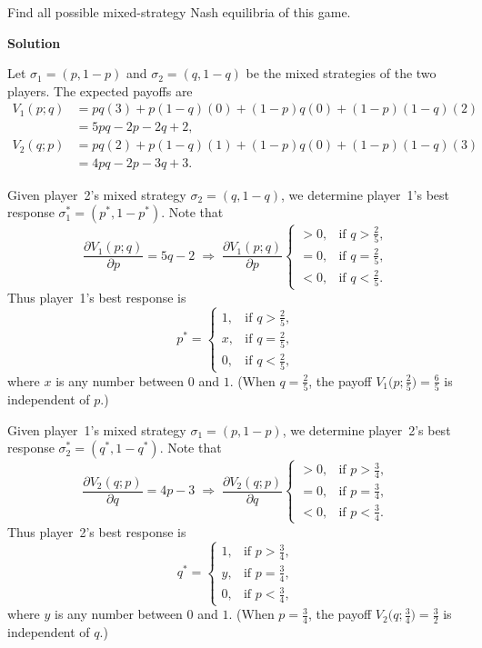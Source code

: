 \documentclass[twoside]{article}
\theoremstyle{definitionstyle}
\begin{document}
\noindent
Find all possible mixed-strategy Nash equilibria of this game.

\bigskip
\noindent
\textbf{Solution}

Let \(\sigma_1 = (p, 1-p)\) and \(\sigma_2 = (q, 1-q)\) be the mixed strategies of the two players. The expected payoffs are
\[
\begin{aligned}
V_1(p; q) &= pq(3) + p(1-q)(0) + (1-p)q(0) + (1-p)(1-q)(2) \\
          &= 5pq - 2p - 2q + 2, \\[4pt]
V_2(q; p) &= pq(2) + p(1-q)(1) + (1-p)q(0) + (1-p)(1-q)(3) \\
          &= 4pq - 2p - 3q + 3.
\end{aligned}
\]

Given player~2's mixed strategy \(\sigma_2 = (q, 1-q)\), we determine player~1’s best response \(\sigma_1^* = (p^*, 1-p^*)\). Note that
\[
\frac{\partial V_1(p; q)}{\partial p} = 5q - 2
\;\Longrightarrow\;
\frac{\partial V_1(p; q)}{\partial p}
\begin{cases}
> 0, & \text{if } q > \frac{2}{5},\\[4pt]
= 0, & \text{if } q = \frac{2}{5},\\[4pt]
< 0, & \text{if } q < \frac{2}{5}.
\end{cases}
\]
Thus player~1's best response is
\[
p^* =
\begin{cases}
1, & \text{if } q > \frac{2}{5},\\[4pt]
x, & \text{if } q = \frac{2}{5},\\[4pt]
0, & \text{if } q < \frac{2}{5},
\end{cases}
\]
where \(x\) is any number between \(0\) and \(1\). (When \(q = \frac{2}{5}\), the payoff \(V_1\bigl(p; \frac{2}{5}\bigr) = \frac{6}{5}\) is independent of \(p\).)

\bigskip
\noindent
Given player~1’s mixed strategy \(\sigma_1 = (p, 1-p)\), we determine player~2’s best response \(\sigma_2^* = (q^*, 1-q^*)\). Note that
\[
\frac{\partial V_2(q; p)}{\partial q} = 4p - 3
\;\Longrightarrow\;
\frac{\partial V_2(q; p)}{\partial q}
\begin{cases}
> 0, & \text{if } p > \frac{3}{4},\\[4pt]
= 0, & \text{if } p = \frac{3}{4},\\[4pt]
< 0, & \text{if } p < \frac{3}{4}.
\end{cases}
\]
Thus player~2’s best response is
\[
q^* =
\begin{cases}
1, & \text{if } p > \frac{3}{4},\\[4pt]
y, & \text{if } p = \frac{3}{4},\\[4pt]
0, & \text{if } p < \frac{3}{4},
\end{cases}
\]
where \(y\) is any number between \(0\) and \(1\). (When \(p = \frac{3}{4}\), the payoff \(V_2\bigl(q; \frac{3}{4}\bigr) = \frac{3}{2}\) is independent of \(q\).)
\end{document}
